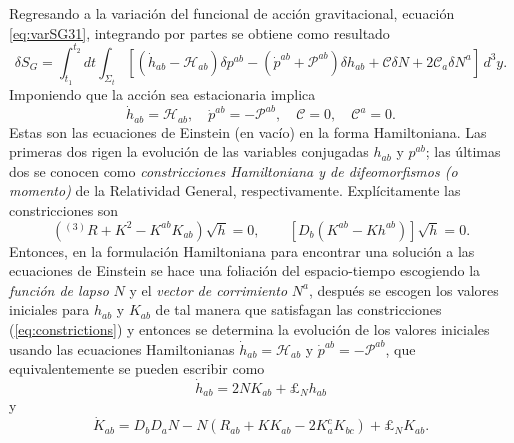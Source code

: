 Regresando a la variaci\'{o}n del funcional de acci\'{o}n gravitacional, ecuaci\'{o}n \eqref{eq:varSG31}, integrando por partes se obtiene como resultado
%
\begin{equation}
\label{varSGHamiltonianform}
\delta S_{G} = \int^{t_{2}}_{t_{1}} dt \int_{\Sigma_{t}} \left[ (\dot{h}_{ab} - \mathcal{H}_{ab}) \delta p^{ab} - (\dot{p}^{ab} + \mathcal{P}^{ab}) \delta h_{ab} + \mathcal{C} \delta N + 2 \mathcal{C}_{a} \delta N^{a} \right] \, d^{3} y.
\end{equation}
%
Imponiendo que la acci\'{o}n sea estacionaria implica
%
\begin{equation}
\label{eq:fieldequationsHamiltonianform}
\dot{h}_{ab} = \mathcal{H}_{ab}, \quad \dot{p}^{ab} = - \mathcal{P}^{ab}, \quad \mathcal{C} = 0, \quad \mathcal{C}^{a} = 0.
\end{equation}
%
Estas son las ecuaciones de Einstein (en vac\'{i}o) en la forma Hamiltoniana. Las primeras dos rigen la evoluci\'{o}n de las variables conjugadas $h_{ab}$ y $p^{ab}$; las \'{u}ltimas dos se conocen como \emph{constricciones Hamiltoniana y de difeomorfismos (o momento)} de la Relatividad General, respectivamente. Expl\'{i}citamente las constricciones son
%
\begin{equation}
\label{eq:constrictions}
\left(^{(3)}R + K^{2} - K^{ab} K_{ab} \right) \sqrt{h} = 0, \qquad \left[D_{b} (K^{ab} - K h^{ab}) \right] \sqrt{h} = 0.
\end{equation}
%
Entonces, en la formulaci\'{o}n Hamiltoniana para encontrar una soluci\'{o}n a las ecuaciones de Einstein se hace una foliaci\'{o}n del espacio-tiempo escogiendo la \emph{funci\'{o}n de lapso} $N$ y el \emph{vector de corrimiento} $N^{a}$, despu\'{e}s se escogen los valores iniciales para $h_{ab}$ y $K_{ab}$ de tal manera que satisfagan las constricciones (\ref{eq:constrictions}) y entonces se determina la evoluci\'{o}n de los valores iniciales usando las ecuaciones Hamiltonianas $\dot{h}_{ab} = \mathcal{H}_{ab}$ y $\dot{p}^{ab} = - \mathcal{P}^{ab}$, que equivalentemente se pueden escribir como
%
\begin{equation}
\dot{h}_{ab} = 2 N K_{ab} + \pounds_{N} h_{ab}
\end{equation}
%
y
%
\begin{equation}
\dot{K}_{ab} = D_{b} D_{a} N - N (R_{ab} + K K_{ab} - 2 K^{c}_{a} K_{bc}) + \pounds_{N} K_{ab}.
\end{equation}